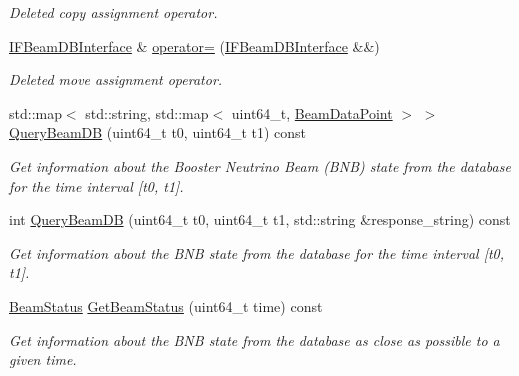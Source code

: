 \begin{DoxyCompactItemize}
\begin{DoxyCompactList}\small\item\em Deleted copy assignment operator. \item\end{DoxyCompactList}\item 
\hypertarget{classIFBeamDBInterface_a66a70c1666620601852ceec5038c3c62}{
\hyperlink{classIFBeamDBInterface}{IFBeamDBInterface} \& \hyperlink{classIFBeamDBInterface_a66a70c1666620601852ceec5038c3c62}{operator=} (\hyperlink{classIFBeamDBInterface}{IFBeamDBInterface} \&\&)}
\label{classIFBeamDBInterface_a66a70c1666620601852ceec5038c3c62}

\begin{DoxyCompactList}\small\item\em Deleted move assignment operator. \item\end{DoxyCompactList}\item 
std::map$<$ std::string, std::map$<$ uint64\_\-t, \hyperlink{structBeamDataPoint}{BeamDataPoint} $>$ $>$ \hyperlink{classIFBeamDBInterface_a7b0e4c42767791f1904540b63772a74d}{QueryBeamDB} (uint64\_\-t t0, uint64\_\-t t1) const 
\begin{DoxyCompactList}\small\item\em Get information about the Booster Neutrino Beam (BNB) state from the database for the time interval \mbox{[}t0, t1\mbox{]}. \item\end{DoxyCompactList}\item 
int \hyperlink{classIFBeamDBInterface_a034ef023cb78989270a4ec2d54a5aa4f}{QueryBeamDB} (uint64\_\-t t0, uint64\_\-t t1, std::string \&response\_\-string) const 
\begin{DoxyCompactList}\small\item\em Get information about the BNB state from the database for the time interval \mbox{[}t0, t1\mbox{]}. \item\end{DoxyCompactList}\item 
\hyperlink{classBeamStatus}{BeamStatus} \hyperlink{classIFBeamDBInterface_add525c53cbf0b85c3cd0d39a5b9b0fdd}{GetBeamStatus} (uint64\_\-t time) const 
\begin{DoxyCompactList}\small\item\em Get information about the BNB state from the database as close as possible to a given time. \item\end{DoxyCompactList}\end{DoxyCompactItemize}
